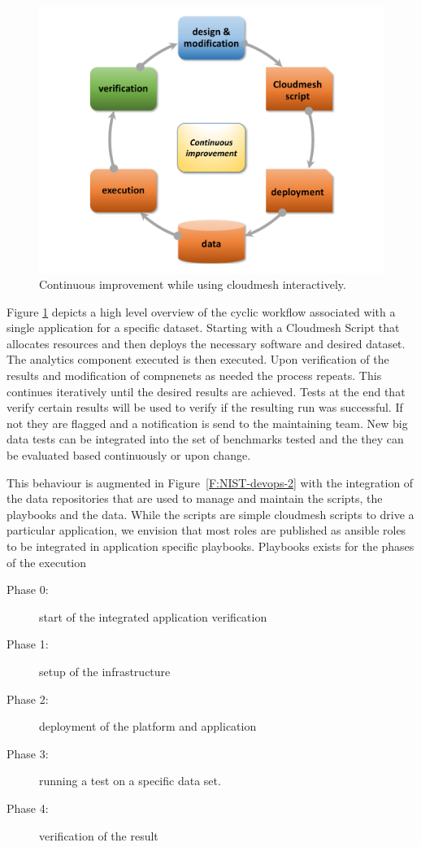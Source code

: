 \documentclass[9pt,twocolumn,twoside]{styles/osajnl}
\begin{document}
\begin{figure}[htb]
  \centering
      \includegraphics[width=1.0\columnwidth]{images/nist-devops-1.pdf}
  \caption{Continuous improvement while using cloudmesh interactively.}
  \label{F:NIST-devops-1}
\end{figure}


Figure \ref{F:NIST-devops-1} depicts a high level overview of the cyclic workflow
associated with a single application for a specific dataset. Starting
with a Cloudmesh Script that allocates resources and then deploys the
necessary software and desired dataset. The analytics component
executed is then executed. Upon verification of the results and
modification of compnenets as needed the process repeats. This
continues iteratively until the desired results are achieved. Tests at
the end that verify certain results will be used to verify if the
resulting run was successful. If not they are flagged and a
notification is send to the maintaining team. New big data tests can
be integrated into the set of benchmarks tested and the they can be
evaluated based continuously or upon change.


This behaviour is augmented in Figure~\ref{F:NIST-devops-2} with the integration of the
data repositories that are used to manage and maintain the scripts,
the playbooks and the data. While the scripts are simple cloudmesh
scripts to drive a particular application, we envision that most roles
are published as ansible roles to be integrated in application
specific playbooks. Playbooks exists for the phases of the execution

\begin{description}
\item[Phase 0:] start of the integrated application verification
\item[Phase 1:] setup of the infrastructure 
\item[Phase 2:] deployment of the platform and application
\item[Phase 3:] running a test on a specific data set.
\item[Phase 4:] verification of the result
\end{description}
\end{document}
